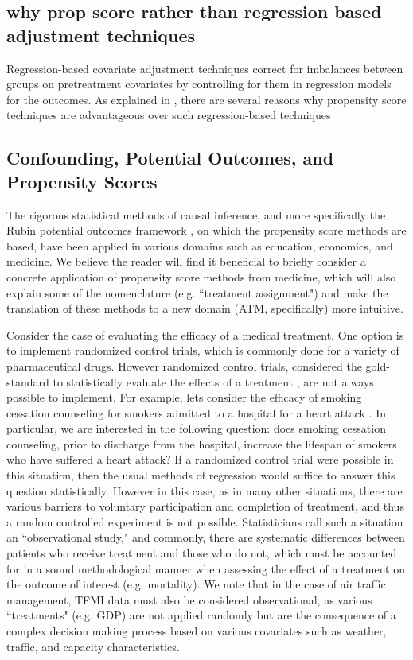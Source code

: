 \subsection{why prop score rather than regression based adjustment techniques}

Regression-based covariate adjustment techniques correct for imbalances between groups on pretreatment covariates by controlling for them in regression models for the outcomes.  As explained in  \cite{mccaffrey2013tutorial}, there are several reasons why propensity score techniques are advantageous over such regression-based techniques






\subsection{Confounding, Potential Outcomes, and Propensity Scores}
The rigorous statistical methods of causal inference, and more specifically the Rubin potential outcomes framework \cite{rubin1974estimating}, on which the propensity score methods are based, have been applied in various domains such as education, economics, and medicine.  We believe the reader will find it beneficial to briefly consider a concrete application of propensity score methods from medicine, which will also explain some of the nomenclature (e.g. ``treatment assignment") and make the translation of these methods to a new domain (ATM, specifically) more intuitive.  

Consider the case of evaluating the efficacy of a medical treatment.  One option is to implement randomized control trials, which is commonly done for a variety of pharmaceutical drugs.  However randomized control trials, considered the gold-standard to statistically evaluate the effects of a treatment \cite{austin2011introduction}, are not always possible to implement.  For example, lets consider the efficacy of smoking cessation counseling for smokers admitted to a hospital for a heart attack \cite{austin2011tutorial}.  In particular, we are interested in the following question: does smoking cessation counseling, prior to discharge from the hospital, increase the lifespan of smokers who have suffered a heart attack?  If a randomized control trial were possible in this situation, then the usual methods of regression would suffice to answer this question statistically.  However in this case, as in many other situations, there are various barriers to voluntary participation and completion of treatment, and thus a random controlled experiment is not possible.  Statisticians call such a situation an ``observational study," and commonly, there are systematic differences between patients who receive treatment and those who do not, which must be accounted for in a sound methodological manner when assessing the effect of a treatment on the outcome of interest (e.g. mortality).  We note that in the case of air traffic management, TFMI data must also be considered observational, as various ``treatments" (e.g. GDP) are not applied randomly but are the consequence of a complex decision making process based on various covariates such as weather, traffic, and capacity characteristics.  

